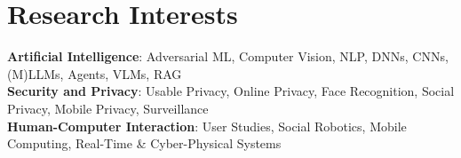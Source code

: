 \section{Research Interests}
 \begin{itemize}[leftmargin=0.5cm, label={}]
    \small{\item{
     \textbf{Artificial Intelligence}{: Adversarial ML, Computer Vision, NLP, DNNs, CNNs, (M)LLMs, Agents, VLMs, RAG} \\\vspace{1pt}
     \textbf{Security and Privacy}{: Usable Privacy, Online Privacy, Face Recognition, Social Privacy, Mobile Privacy, Surveillance} \\\vspace{1pt}
     \textbf{Human-Computer Interaction}{: User Studies, Social Robotics, Mobile Computing, Real-Time \& Cyber-Physical Systems} \\\vspace{1pt}
    }}
 \end{itemize}